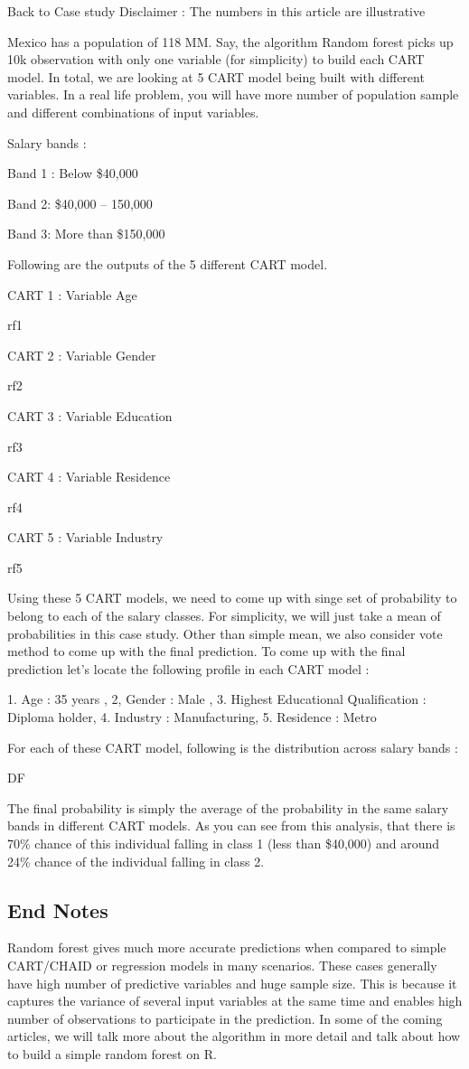 \documentclass[a4paper,12pt]{article}
\begin{document}
Back to Case  study
Disclaimer : The numbers in this article are illustrative

Mexico has a population of 118 MM. Say, the algorithm Random forest picks up 10k observation with only one variable (for simplicity) to build each CART model. In total, we are looking at 5 CART model being built with different variables. In a real life problem, you will have more number of population sample and different combinations of  input variables.

Salary bands :

Band 1 : Below \$40,000

Band 2: \$40,000 – 150,000

Band 3: More than \$150,000

Following are the outputs of the 5 different CART model.

CART 1 : Variable Age

rf1

CART 2 : Variable Gender

rf2

CART 3 : Variable Education

rf3

CART 4 : Variable Residence

rf4

CART 5 : Variable Industry

rf5

Using these 5 CART models, we need to come up with singe set of probability to belong to each of the salary classes. For simplicity, we will just take a mean of probabilities in this case study. Other than simple mean, we also consider vote method to come up with the final prediction. To come up with the final prediction let’s locate the following profile in each CART model :

1. Age : 35 years , 2, Gender : Male , 3. Highest Educational Qualification : Diploma holder, 4. Industry : Manufacturing, 5. Residence : Metro

For each of these CART model, following is the distribution across salary bands :

DF

The final probability is simply the average of the probability in the same salary bands in different CART models. As you can see from this analysis, that there is 70\% chance of this individual falling in class 1 (less than \$40,000) and around 24\% chance of the individual falling in class 2.



\subsection*{End Notes}
Random forest gives much more accurate predictions when compared to simple CART/CHAID or regression models in many scenarios. These cases generally have high number of predictive variables and huge sample size. This is because it captures the variance of several input variables at the same time and enables high number of observations to participate in the prediction. In some of the coming articles, we will talk more about the algorithm in more detail and talk about how to build a simple random forest on R.
\end{document}
